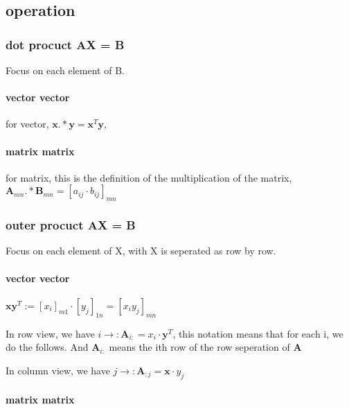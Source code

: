 \documentclass[UTF8]{../../09-Mathematics}
\begin{document}
\subsection{operation}



\subsubsection{dot procuct AX = B}

Focus on each element of B.

\paragraph{vector vector}

for vector, $\boldsymbol x  . * \boldsymbol y  = \boldsymbol x^T \boldsymbol y$, 






\paragraph{matrix matrix}

for matrix, this is the definition of the multiplication of the matrix, $\boldsymbol A_{mn}  . * \boldsymbol B_{mn}  = [a_{ij} \cdot b_{ij} ]_{mn}$



\subsubsection{outer procuct AX = B}

Focus on each element of X, with X is seperated as row by row.

\paragraph{vector vector}

$\boldsymbol x \boldsymbol y^T := [x_i]_{m1} \cdot  [y_j]_{1n} =[x_i y_j]_{mn}   $

In row view, we have $i \rightarrow : \boldsymbol A _{i:} = x_i \cdot \boldsymbol y^T$, this notation means that for each i, we do the follows. And $ \boldsymbol A _{i:}$ means the ith row of the row seperation of $ \boldsymbol A$

In column view, we have $j \rightarrow : \boldsymbol A _{:j} = \boldsymbol x \cdot  y_j$

\paragraph{matrix matrix}
\end{document}
